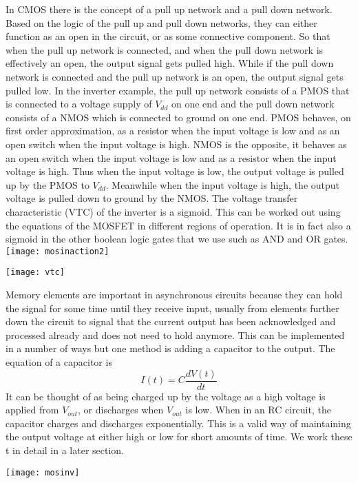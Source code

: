 \documentclass{article}
\begin{document}
\newline
In CMOS there is the concept of a pull up network and a pull down network.  Based on the logic of the pull up and pull down networks, they can either function as an open in the circuit, or as some connective component.  So that when the pull up network is connected, and when the pull down network is effectively an open, the output signal gets pulled high.  While if the pull down network is connected and the pull up network is an open, the output signal gets pulled low.  In the inverter example, the pull up network consists of a PMOS that is connected to a voltage supply of $V_{dd}$ on one end and the pull down network consists of a NMOS which is connected to ground on one end.  PMOS behaves, on first order approximation, as a resistor when the input voltage is low and as an open switch when the input voltage is high.  NMOS is the opposite, it behaves as an open switch when the input voltage is low and as a resistor when the input voltage is high.  Thus when the input voltage is low, the output voltage is pulled up by the PMOS to $V_{dd}$.  Meanwhile when the input voltage is high, the output voltage is pulled down to ground by the NMOS.  The voltage transfer characteristic (VTC) of the inverter is a sigmoid.  This can be worked out using the equations of the MOSFET in different regions of operation.  It is in fact also a sigmoid in the other boolean logic gates that we use such as AND and OR gates.
\newline
\texttt{[image: mosinaction2]}
\begin{center}
\texttt{[image: vtc]}
\end{center}
\newline

Memory elements are important in asynchronous circuits because they can hold the signal for some time until they receive input, usually from elements further down the circuit to signal that the current output has been acknowledged and processed already and does not need to hold anymore.  This can be implemented in a number of ways but one method is adding a capacitor to the output.  The equation of a capacitor is 
\[I(t)=C\frac{dV(t)}{dt}
\]
It can be thought of as being charged up by the voltage as a high voltage is applied from $V_{out}$, or discharges when $V_{out}$ is low.  When in an RC circuit, the capacitor charges and discharges exponentially.  This is a valid way of maintaining the output voltage at either high or low for short amounts of time.  We work these t in detail in a later section. 
\begin{center}
\texttt{[image: mosinv]}
\end{center}
\end{document}
